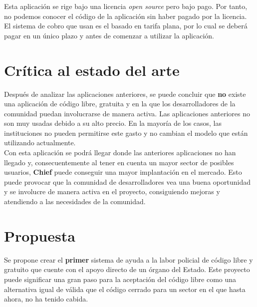 Esta aplicación se rige bajo una licencia \textit{open source} pero bajo pago. Por tanto, no podemos conocer el código de la aplicación
sin haber pagado por la licencia. El sistema de cobro que usan es el basado en tarifa plana, por lo cual se deberá pagar en un
único plazo y antes de comenzar a utilizar la aplicación. 


\section{Crítica al estado del arte}

Después de analizar las aplicaciones anteriores, se puede concluir que \textbf{no} existe una aplicación
de código libre, gratuita y en la que los desarrolladores de la comunidad puedan involucrarse de manera activa.
Las aplicaciones anteriores no son muy usadas debido a su alto precio. En la mayoría de los casos, las instituciones
no pueden permitirse este gasto y no cambian el modelo que están utilizando actualmente.\\


Con esta aplicación se podrá llegar donde las anteriores aplicaciones no han llegado y, consecuentemente al tener en cuenta un mayor sector de posibles usuarios, 
\textbf{Chief} puede conseguir una mayor implantación en el mercado. Esto puede provocar que la comunidad de desarrolladores vea una buena oportunidad y se involucre 
de manera activa en el proyecto, consiguiendo mejoras y atendiendo a las necesidades de la comunidad.

\section{Propuesta}

Se propone crear el \textbf{primer} sistema de ayuda a la labor policial de código libre y gratuito que cuente
con el apoyo directo de un órgano del Estado. Este proyecto puede significar una gran paso para la aceptación 
del código libre como una alternativa igual de válida que el código cerrado para un sector en el 
que hasta ahora, no ha tenido cabida.\\   